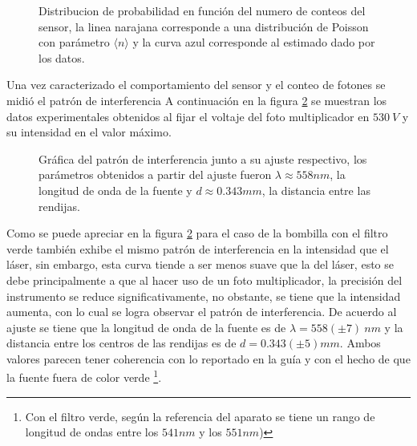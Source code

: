 \documentclass[%
 reprint,
 amsmath,amssymb,
 aps,
]{revtex4-1}
\begin{document}
\begin{figure}[h]
\caption{\label{distribucion} Distribucion de probabilidad en función del numero de conteos del sensor, la linea narajana corresponde a una distribución de Poisson con parámetro $\langle n\rangle$ y la curva azul corresponde al estimado dado por los datos.}
\end{figure}
Una vez caracterizado el comportamiento del sensor y el conteo de fotones se midió el patrón de interferencia A continuación en la figura \ref{interferencia_laserverde} se muestran los datos experimentales obtenidos al fijar el voltaje del foto multiplicador en $530\ V$ y su intensidad en el valor máximo.
\begin{figure}[h]
\caption{\label{interferencia_laserverde} Gráfica del patrón de interferencia junto a su ajuste respectivo, los parámetros obtenidos a partir del ajuste fueron $\lambda\approx 558 nm$, la longitud de onda de la fuente y $d\approx 0.343 mm$, la distancia entre las rendijas.}
\end{figure}


Como se puede apreciar en la figura \ref{interferencia_laserverde} para el caso de la bombilla con el filtro verde también exhibe el mismo patrón de interferencia en la intensidad que el láser, sin embargo, esta curva tiende a ser menos suave que la del láser, esto se debe principalmente a que al hacer uso de un foto multiplicador, la precisión del instrumento se reduce significativamente, no obstante, se tiene que la intensidad aumenta, con lo cual se logra observar el patrón de interferencia. De acuerdo al ajuste se tiene que la longitud de onda de la fuente es de $\lambda=558(\pm 7)\ nm$ y la distancia entre los centros de las rendijas es de $d=0.343(\pm 5) mm$. Ambos valores parecen tener coherencia con lo reportado en la guía y con el hecho de que la fuente fuera de color verde \footnote{Con el filtro verde, según la referencia \cite{guia} del aparato se tiene un rango de longitud de ondas entre los $541nm$ y los  $551 nm$)}.
\end{document}

